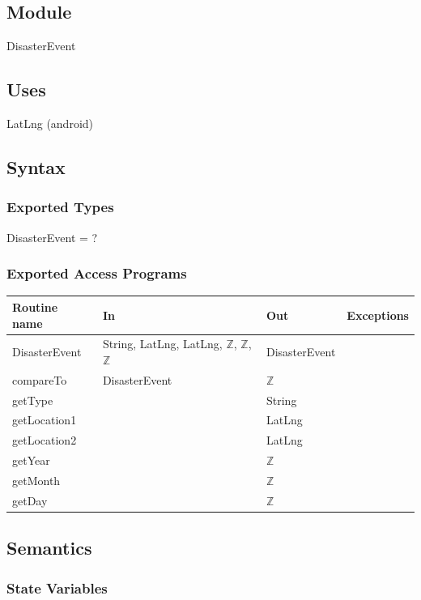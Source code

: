 \documentclass[12pt]{article}
\begin{document}
\subsection {Module}

DisasterEvent

\subsection {Uses}

LatLng (android)

\subsection {Syntax}

\subsubsection {Exported Types}

DisasterEvent = ?

\subsubsection {Exported Access Programs}

\begin{tabular}{| l | l | l | l |}
\hline
\textbf{Routine name} & \textbf{In} & \textbf{Out} & \textbf{Exceptions}\\
\hline
DisasterEvent & String, LatLng, LatLng, $\mathbb{Z}$, $\mathbb{Z}$, $\mathbb{Z}$ & DisasterEvent & \\
\hline
compareTo & DisasterEvent & $\mathbb{Z}$ & ~ \\
\hline
getType & ~ & String & ~ \\
\hline
getLocation1 & ~ & LatLng & ~ \\
\hline
getLocation2 & ~ & LatLng & ~ \\
\hline
getYear & ~ & $\mathbb{Z}$ & ~ \\
\hline
getMonth & ~ & $\mathbb{Z}$ & ~ \\
\hline
getDay & ~ & $\mathbb{Z}$ & ~ \\
\hline
\end{tabular}

\subsection {Semantics}

\subsubsection {State Variables}
\end{document}
